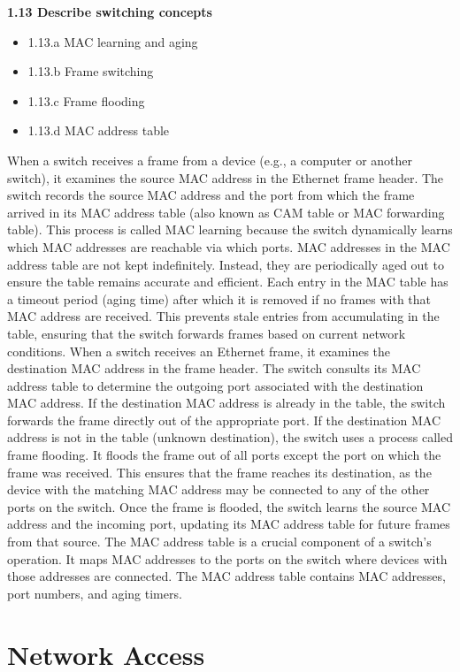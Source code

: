 \documentclass{article}
\begin{document}
\textbf{1.13 Describe switching concepts}
\begin{itemize}
\item 1.13.a MAC learning and aging
\item 1.13.b Frame switching
\item 1.13.c Frame flooding
\item 1.13.d MAC address table
\end{itemize}

	When a switch receives a frame from a device (e.g., a computer or another switch), it examines the source MAC address in the Ethernet frame header. The switch records the source MAC address and the port from which the frame arrived in its MAC address table (also known as CAM table or MAC forwarding table). This process is called MAC learning because the switch dynamically learns which MAC addresses are reachable via which ports. MAC addresses in the MAC address table are not kept indefinitely. Instead, they are periodically aged out to ensure the table remains accurate and efficient. Each entry in the MAC table has a timeout period (aging time) after which it is removed if no frames with that MAC address are received. This prevents stale entries from accumulating in the table, ensuring that the switch forwards frames based on current network conditions. When a switch receives an Ethernet frame, it examines the destination MAC address in the frame header. The switch consults its MAC address table to determine the outgoing port associated with the destination MAC address. If the destination MAC address is already in the table, the switch forwards the frame directly out of the appropriate port. If the destination MAC address is not in the table (unknown destination), the switch uses a process called frame flooding. It floods the frame out of all ports except the port on which the frame was received. This ensures that the frame reaches its destination, as the device with the matching MAC address may be connected to any of the other ports on the switch. Once the frame is flooded, the switch learns the source MAC address and the incoming port, updating its MAC address table for future frames from that source. The MAC address table is a crucial component of a switch's operation. It maps MAC addresses to the ports on the switch where devices with those addresses are connected. The MAC address table contains MAC addresses, port numbers, and aging timers.

\section{Network Access}
\end{document}
